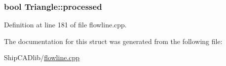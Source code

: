 \subsubsection[{\texorpdfstring{processed}{processed}}]{\setlength{\rightskip}{0pt plus 5cm}bool Triangle\+::processed}\hypertarget{structTriangle_aaeb1bcbff3141c314e7f9d2212cbc11c}{}\label{structTriangle_aaeb1bcbff3141c314e7f9d2212cbc11c}


Definition at line 181 of file flowline.\+cpp.



The documentation for this struct was generated from the following file\+:\begin{DoxyCompactItemize}
\item 
Ship\+C\+A\+Dlib/\hyperlink{flowline_8cpp}{flowline.\+cpp}\end{DoxyCompactItemize}
